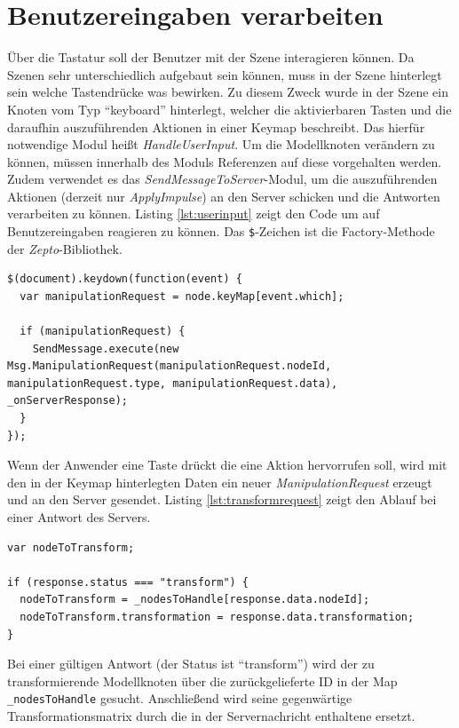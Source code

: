 \section{Benutzereingaben verarbeiten}
Über die Tastatur soll der Benutzer mit der Szene interagieren können. Da Szenen sehr unterschiedlich aufgebaut sein können, muss in der Szene hinterlegt sein welche Tastendrücke was bewirken. Zu diesem Zweck wurde in der Szene ein Knoten vom Typ "`keyboard"' hinterlegt, welcher die aktivierbaren Tasten und die daraufhin auszuführenden Aktionen in einer Keymap beschreibt. Das hierfür notwendige Modul heißt \textit{HandleUserInput}. Um die Modellknoten verändern zu können, müssen innerhalb des Moduls Referenzen auf diese vorgehalten werden. Zudem verwendet es das \textit{SendMessageToServer}-Modul, um die auszuführenden Aktionen (derzeit nur \textit{ApplyImpulse}) an den Server schicken und die Antworten verarbeiten zu können. Listing \ref{lst:userinput} zeigt den Code um auf Benutzereingaben reagieren zu können. Das \texttt{\$}-Zeichen ist die Factory-Methode der \textit{Zepto}-Bibliothek.
\lstset{language=JavaScript}
\begin{lstlisting}[caption={Reaktion auf Benutzereingaben}, label={lst:userinput}]
$(document).keydown(function(event) {
  var manipulationRequest = node.keyMap[event.which];

  if (manipulationRequest) {
    SendMessage.execute(new Msg.ManipulationRequest(manipulationRequest.nodeId, manipulationRequest.type, manipulationRequest.data), _onServerResponse);
  }
});
\end{lstlisting}
Wenn der Anwender eine Taste drückt die eine Aktion hervorrufen soll, wird mit den in der Keymap hinterlegten Daten ein neuer \textit{ManipulationRequest} erzeugt und an den Server gesendet. Listing \ref{lst:transformrequest} zeigt den Ablauf bei einer Antwort des Servers.
\lstset{language=JavaScript}
\begin{lstlisting}[caption={Reaktion auf Benutzereingaben}, label={lst:transformrequest}]
var nodeToTransform;

if (response.status === "transform") {
  nodeToTransform = _nodesToHandle[response.data.nodeId];
  nodeToTransform.transformation = response.data.transformation;
}
\end{lstlisting}
Bei einer gültigen Antwort (der Status ist "`transform"') wird der zu transformierende Modellknoten über die zurückgelieferte ID in der Map \texttt{\_nodesToHandle} gesucht. Anschließend wird seine gegenwärtige Transformationsmatrix durch die in der Servernachricht enthaltene ersetzt.

